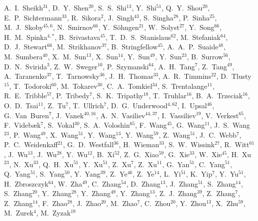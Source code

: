 {A.~I.~Sheikh$^{31}$,
D.~Y.~Shen$^{20}$,
S.~S.~Shi$^{13}$,
Y.~Shi$^{51}$,
Q.~Y.~Shou$^{20}$,
E.~P.~Sichtermann$^{33}$,
R.~Sikora$^{2}$,
J.~Singh$^{43}$,
S.~Singha$^{28}$,
P.~Sinha$^{25}$,
M.~J.~Skoby$^{45,6}$,
N.~Smirnov$^{66}$,
Y.~S\"{o}hngen$^{21}$,
W.~Solyst$^{27}$,
Y.~Song$^{66}$,
H.~M.~Spinka$^{4,*}$,
B.~Srivastava$^{45}$,
T.~D.~S.~Stanislaus$^{62}$,
M.~Stefaniak$^{64}$,
D.~J.~Stewart$^{66}$,
M.~Strikhanov$^{37}$,
B.~Stringfellow$^{45}$,
A.~A.~P.~Suaide$^{48}$,
M.~Sumbera$^{40}$,
X.~M.~Sun$^{13}$,
X.~Sun$^{14}$,
Y.~Sun$^{49}$,
Y.~Sun$^{23}$,
B.~Surrow$^{56}$,
D.~N.~Svirida$^{3}$,
Z.~W.~Sweger$^{10}$,
P.~Szymanski$^{64}$,
A.~H.~Tang$^{7}$,
Z.~Tang$^{49}$,
A.~Taranenko$^{37}$,
T.~Tarnowsky$^{36}$,
J.~H.~Thomas$^{33}$,
A.~R.~Timmins$^{22}$,
D.~Tlusty$^{15}$,
T.~Todoroki$^{60}$,
M.~Tokarev$^{30}$,
C.~A.~Tomkiel$^{34}$,
S.~Trentalange$^{11}$,
R.~E.~Tribble$^{57}$,
P.~Tribedy$^{7}$,
S.~K.~Tripathy$^{18}$,
T.~Truhlar$^{16}$,
B.~A.~Trzeciak$^{16}$,
O.~D.~Tsai$^{11}$,
Z.~Tu$^{7}$,
T.~Ullrich$^{7}$,
D.~G.~Underwood$^{4,62}$,
I.~Upsal$^{46}$,
G.~Van~Buren$^{7}$,
J.~Vanek$^{40,16}$,
A.~N.~Vasiliev$^{44,37}$,
I.~Vassiliev$^{19}$,
V.~Verkest$^{65}$,
F.~Videb{\ae}k$^{7}$,
S.~Vokal$^{30}$,
S.~A.~Voloshin$^{65}$,
F.~Wang$^{45}$,
G.~Wang$^{11}$,
J.~S.~Wang$^{23}$,
P.~Wang$^{49}$,
X.~Wang$^{51}$,
Y.~Wang$^{13}$,
Y.~Wang$^{59}$,
Z.~Wang$^{51}$,
J.~C.~Webb$^{7}$,
P.~C.~Weidenkaff$^{21}$,
G.~D.~Westfall$^{36}$,
H.~Wieman$^{33}$,
S.~W.~Wissink$^{27}$,
R.~Witt$^{61}$,
J.~Wu$^{13}$,
J.~Wu$^{28}$,
Y.~Wu$^{12}$,
B.~Xi$^{52}$,
Z.~G.~Xiao$^{59}$,
G.~Xie$^{33}$,
W.~Xie$^{45}$,
H.~Xu$^{23}$,
N.~Xu$^{33}$,
Q.~H.~Xu$^{51}$,
Y.~Xu$^{51}$,
Z.~Xu$^{7}$,
Z.~Xu$^{11}$,
G.~Yan$^{51}$,
C.~Yang$^{51}$,
Q.~Yang$^{51}$,
S.~Yang$^{50}$,
Y.~Yang$^{39}$,
Z.~Ye$^{46}$,
Z.~Ye$^{14}$,
L.~Yi$^{51}$,
K.~Yip$^{7}$,
Y.~Yu$^{51}$,
H.~Zbroszczyk$^{64}$,
W.~Zha$^{49}$,
C.~Zhang$^{54}$,
D.~Zhang$^{13}$,
J.~Zhang$^{51}$,
S.~Zhang$^{14}$,
S.~Zhang$^{20}$,
Y.~Zhang$^{28}$,
Y.~Zhang$^{49}$,
Y.~Zhang$^{13}$,
Z.~J.~Zhang$^{39}$,
Z.~Zhang$^{7}$,
Z.~Zhang$^{14}$,
F.~Zhao$^{28}$,
J.~Zhao$^{20}$,
M.~Zhao$^{7}$,
C.~Zhou$^{20}$,
Y.~Zhou$^{13}$,
X.~Zhu$^{59}$,
M.~Zurek$^{4}$,
M.~Zyzak$^{19}$
}

\address{\rm{(STAR Collaboration)}}

